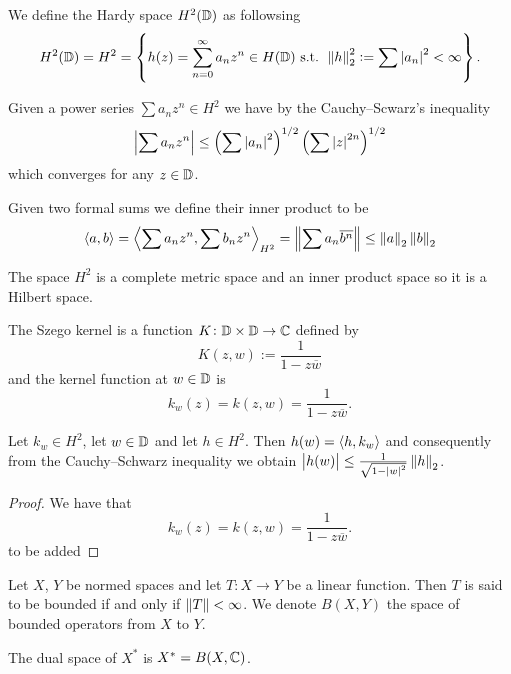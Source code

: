 \documentclass[11pt,a4paper]{article}
\begin{document}
\begin{definition}
  We define the Hardy space $H^2(\mathbb{D})$ as followsing
  \[
    H^2(\mathbb{D}) = H^2 =
    \left\{h(z) = \sum_{n=0}^{\infty} a_n z^n \in H(\mathbb{D}) \text{ s.t. }
    \left\lVert h\right\rVert_2^2 := \sum \left\lvert a_n\right\rvert^2 < \infty\right\}.
  \]
\end{definition}
\begin{remark}
  Given a power series $\sum a_n z^n \in H^2$ we have by
  the Cauchy--Scwarz's inequality
  \[
    \abs{\sum a_n z^n} \le
    \del{\sum \abs{a_n}^2}^{1/2}
    \del{\sum \abs{z}^{2n}}^{1/2}
  \]
  which converges for any $z \in \mathbb{D}$.
\end{remark}

\begin{definition}
  Given two formal sums we define their inner product to be
  \[
    \left\langle a, b \right\rangle =
    \left\langle \sum a_n z^n, \sum b_n z^n \right\rangle_{H^2} =
    \left\lVert\sum a_n \overline{b^n}\right\rVert \le
    \left\lVert a\right\rVert_2 \left\lVert b\right\rVert_2
  \]
\end{definition}

\begin{remark}
  The space $H^2$ is a complete metric space and an inner
  product space so it is a Hilbert space.
\end{remark}

\begin{definition}
  The Szego kernel is a function
  $K \colon \mathbb{D} \times \mathbb{D} \to \mathbb{C}$
  defined by
  \[
    K(z,w) := \frac{1}{1 - z \overline{w}}
  \]
  and the kernel function at $w \in \mathbb{D}$ is
  \[
    k_w(z) = k(z,w) = \frac{1}{1 - z \overline{w}}.
  \]
\end{definition}

\begin{proposition}
  Let $k_w \in H^2$,
  let $w \in \mathbb{D}$
  and let $h \in H^2$.
  Then $h(w) = \left\langle h, k_w \right\rangle$
  and consequently from the Cauchy--Schwarz inequality we obtain
  $\left\lvert h(w)\right\rvert \le \frac{1}{\sqrt{1 - \left\lvert w\right\rvert^2}} \left\lVert h\right\rVert_2$.
\end{proposition}
\begin{proof}
  We have that
  \[
    k_w(z) = k(z,w) = \frac{1}{1 - z \overline{w}}.
  \]
  to be added
\end{proof}

\begin{definition}
  Let $X$, $Y$ be normed spaces
  and let $T \colon X \to Y$ be a linear function.
  Then $T$ is said to be bounded if and only if $\left\lVert T\right\rVert < \infty$.
  We denote $B(X,Y)$ the space of bounded operators from $X$ to $Y$.
\end{definition}
\begin{remark}
  The dual space of $X^*$ is $X^* = B(X,\mathbb{C})$.
\end{remark}
\end{document}
